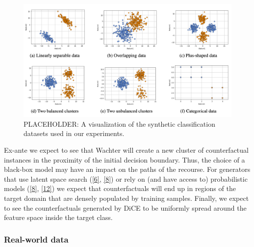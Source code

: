 \documentclass[
  conference]{IEEEtran}
\begin{document}
\begin{figure}

{\centering \includegraphics{www/synthetic_data.png}

}

\caption{\label{fig-synthetic-data}PLACEHOLDER: A visualization of the
synthetic classification datasets used in our experiments.}

\end{figure}

Ex-ante we expect to see that Wachter will create a new cluster of
counterfactual instances in the proximity of the initial decision
boundary. Thus, the choice of a black-box model may have an impact on
the paths of the recourse. For generators that use latent space search
(\protect\hyperlink{ref-joshi2019towards}{{[}6{]}},
\protect\hyperlink{ref-antoran2020getting}{{[}8{]}}) or rely on (and
have access to) probabilistic models
(\protect\hyperlink{ref-antoran2020getting}{{[}8{]}},
\protect\hyperlink{ref-schut2021generating}{{[}12{]}}) we expect that
counterfactuals will end up in regions of the target domain that are
densely populated by training samples. Finally, we expect to see the
counterfactuals generated by DiCE to be uniformly spread around the
feature space inside the target class.

\hypertarget{real-world-data}{%
\subsubsection{Real-world data}\label{real-world-data}}
\end{document}
